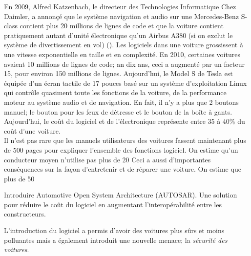 En 2009, Alfred Katzenbach, le directeur des Technologies Informatique Chez Daimler, a annon\c c\'e
que le syst\`eme navigation et audio sur une Mercedes-Benz  S-class contient plus 20
millions de lignes de code et que la voiture contient pratiquement autant d'unit\'e \'electronique qu'un Airbus A380 (si on exclut le syst\`eme de divertissement en vol) (\cite{Cha09}).  Les logiciels dans une voiture grossissent \`a une vitesse exponentielle en taille et en complexit\'e. En 2010, certaines voitures avaient 10 millions de lignes de code; an dix ans, ceci a augment\'e par un facteur 15, pour environ 150 millions de lignes. Aujourd'hui, le Model S de Tesla est \'equip\'ee d'un \'ecran tactile de 17 pouces bas\'e sur un syst\`eme d'exploitation Linux qui contr\^ole quasiment toute les fonctions de la voiture, de la performance moteur au syst\`eme audio et de navigation. En fait, il n'y a plus que 2 boutons manuel; le bouton pour les feux de d\'etresse et le bouton de la bo\^ite \`a gants. \\
Aujourd'hui, le co\^ut du logiciel et de l'\'electronique repr\'esente entre 35 \`a 40\% du co\^ut d'une voiture. \\
Il n'est pas rare que les manuels utilisateurs des voitures fassent maintenant plus de 500 pages pour expliquer l'ensemble des fonctions logiciel. On estime qu'un conducteur moyen n'utilise pas plus de 20%
Ceci a aussi d'importantes cons\'equences sur la fa\c con d'entretenir et de r\'eparer une voiture. On estime que plus de 50%



\begin{tbd}
Introduire Automotive Open System Architecture (AUTOSAR). Une solution pour r\'eduire le co\^ut du logiciel en augmentant l'interop\'erabilit\'e entre les constructeurs.
\end{tbd}


L'introduction du logiciel a permis d'avoir des voitures plus s\^urs et moins polluantes mais a \'egalement introduit une nouvelle menace; la \emph{s\'ecurit\'e des voitures}. 


